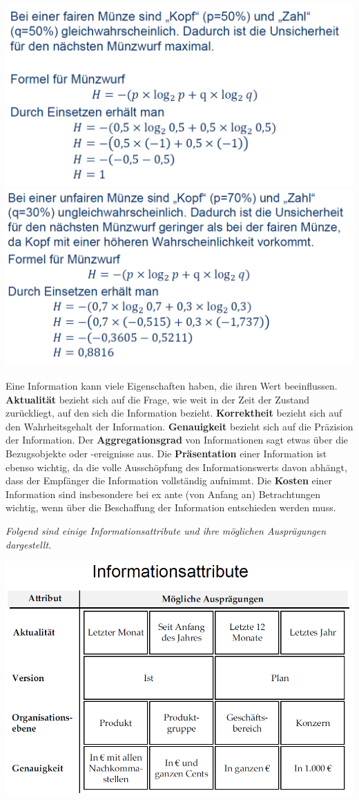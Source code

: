 \documentclass[]{article}
\begin{document}
\includegraphics{img/Bsp fairer Munzwurf.png}
\includegraphics{img/Bsp unfairer Munzwurf.png}

Eine Information kann viele Eigenschaften haben, die ihren Wert
beeinflussen. \textbf{Aktualität} bezieht sich auf die Frage, wie weit
in der Zeit der Zustand zurückliegt, auf den sich die Information
bezieht. \textbf{Korrektheit} bezieht sich auf den Wahrheitsgehalt der
Information. \textbf{Genauigkeit} bezieht sich auf die Präzision der
Information. Der \textbf{Aggregationsgrad} von Informationen sagt etwas
über die Bezugsobjekte oder -ereignisse aus. Die \textbf{Präsentation}
einer Information ist ebenso wichtig, da die volle Ausschöpfung des
Informationswerts davon abhängt, dass der Empfänger die Information
vollständig aufnimmt. Die \textbf{Kosten} einer Information sind
insbesondere bei ex ante (von Anfang an) Betrachtungen wichtig, wenn
über die Beschaffung der Information entschieden werden muss.

\emph{Folgend sind einige Informationsattribute und ihre möglichen
Ausprägungen dargestellt.}

\includegraphics{img/Informationsattribute.png}
\end{document}
